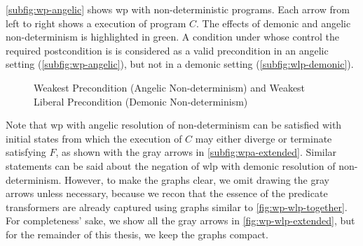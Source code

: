 \autoref{subfig:wp-angelic} shows wp with non-deterministic programs. 
Each arrow from left to right shows a  execution of program $C$. 
The effects of demonic and angelic non-determinism is highlighted in green. 
A condition under whose control the required postcondition is  is considered as a valid precondition in an angelic setting (\autoref{subfig:wp-angelic}), but not in a demonic setting (\autoref{subfig:wlp-demonic}). 


\begin{figure}[ht!]\centering
  \hfill
\caption{Weakest Precondition (Angelic Non-determinism) and Weakest Liberal Precondition (Demonic Non-determinism)}
\label{fig:wp-wlp-together}
\end{figure}

Note that wp with angelic resolution of non-determinism can be satisfied with initial states from which the execution of $C$ may either diverge or terminate satisfying $F$, as shown with the gray arrows in \autoref{subfig:wpa-extended}. 
Similar statements can be said about the negation of wlp with demonic resolution of non-determinism. 
However, to make the graphs clear, we omit drawing the gray arrows unless necessary, because we recon that the essence of the predicate transformers are already captured using graphs similar to \autoref{fig:wp-wlp-together}. 
For completeness' sake, we show all the gray arrows in \autoref{fig:wp-wlp-extended}, but for the remainder of this thesis, we keep the graphs compact. 


